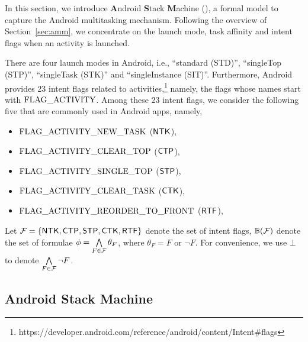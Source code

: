 
In this section, we introduce \textbf{A}ndroid \textbf{S}tack \textbf{M}achine (\AMASS), a formal model to capture the Android multitasking mechanism. 
%
Following the overview of Section~\ref{sec:amm}, we concentrate on the launch mode, task affinity and intent flags when an activity is launched.  

There are four launch modes in Android, i.e., ``standard (STD)'', ``singleTop (STP)'', ``singleTask (STK)'' and ``singleInstance (SIT)''. Furthermore, Android provides 23 intent flags related to activities,\footnote{https://developer.android.com/reference/android/content/Intent\#flags}
namely, the flags whose names start with $\rm FLAG\_ACTIVITY$. Among these 23 intent flags, we consider the following five that are commonly used in Android apps, namely,
\begin{itemize}
	\item $\rm FLAG\_ACTIVITY\_NEW\_TASK$ (${\sf NTK}$),
	\item $\rm FLAG\_ACTIVITY\_CLEAR\_TOP$ (${\sf CTP}$),
	\item $\rm  FLAG\_ACTIVITY\_SINGLE\_TOP$ (${\sf STP}$),
	\item $\rm  FLAG\_ACTIVITY\_CLEAR\_TASK$ (${\sf CTK}$),
	\item $\rm FLAG\_ACTIVITY\_REORDER\_TO\_FRONT$ (${\sf RTF}$),
\end{itemize}

Let $\mathcal{F}=\{{\sf NTK}, {\sf CTP}, {\sf STP}, {\sf CTK}, {\sf RTF} \}$ denote the set of intent flags, $\mathbb{B}(\mathcal{F})$ denote the set of formulae $\phi = \bigwedge \limits_{F \in \mathcal{F}} \theta_F$, where $\theta_F = F$ or $\neg F$. For convenience, we use $\bot$ to denote $ \bigwedge \limits_{F \in \mathcal{F}} \neg F$. 


\subsection{Android Stack Machine}


